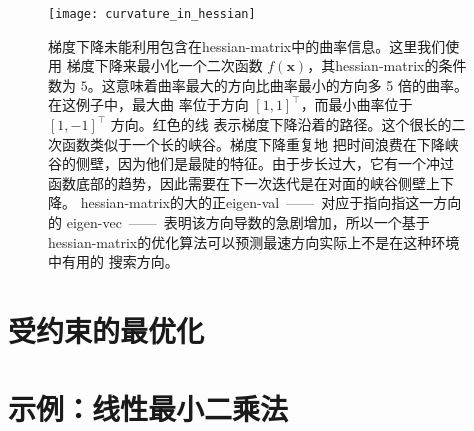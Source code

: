 \begin{figure}[h]
  \centering
  \texttt{[image: curvature\_in\_hessian]}
  \caption{梯度下降未能利用包含在\gls*{hessian-matrix}中的曲率信息。这里我们使用
    梯度下降来最小化一个二次函数 $f(\pmb{x})$，其\gls*{hessian-matrix}的条件数为
    $5$。这意味着曲率最大的方向比曲率最小的方向多 5 倍的曲率。在这例子中，最大曲
    率位于方向 ${[1,1]}^{\top}$，而最小曲率位于 ${[1,-1]}^{\top}$ 方向。红色的线
    表示梯度下降沿着的路径。这个很长的二次函数类似于一个长的峡谷。梯度下降重复地
    把时间浪费在下降峡谷的侧壁，因为他们是最陡的特征。由于步长过大，它有一个冲过
    函数底部的趋势，因此需要在下一次迭代是在对面的峡谷侧壁上下降。
    \gls*{hessian-matrix}的大的正\gls*{eigen-val}~——~对应于指向指这一方向的
    \gls*{eigen-vec}~——~表明该方向导数的急剧增加，所以一个基于
    \gls*{hessian-matrix}的优化算法可以预测最速方向实际上不是在这种环境中有用的
    搜索方向。\label{fig:curvature_in_hessian}}
\end{figure}

\section{受约束的最优化}
\label{sec:constrained_optimization}

\section{示例：线性最小二乘法}
\label{sec:example:linear_least_squares}
